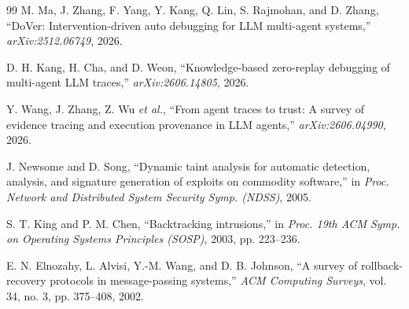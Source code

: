 \documentclass[10pt,twocolumn,a4paper]{article}
\begin{document}
\begin{thebibliography}{99}
M. Ma, J. Zhang, F. Yang, Y. Kang, Q. Lin, S. Rajmohan, and D. Zhang, ``DoVer:
Intervention-driven auto debugging for LLM multi-agent systems,''
\emph{arXiv:2512.06749}, 2026.

D. H. Kang, H. Cha, and D. Weon, ``Knowledge-based zero-replay debugging of
multi-agent LLM traces,'' \emph{arXiv:2606.14805}, 2026.

Y. Wang, J. Zhang, Z. Wu \emph{et al.}, ``From agent traces to trust: A survey
of evidence tracing and execution provenance in LLM agents,''
\emph{arXiv:2606.04990}, 2026.

J. Newsome and D. Song, ``Dynamic taint analysis for automatic detection,
analysis, and signature generation of exploits on commodity software,'' in
\emph{Proc. Network and Distributed System Security Symp. (NDSS)}, 2005.

S. T. King and P. M. Chen, ``Backtracking intrusions,'' in \emph{Proc. 19th ACM
Symp. on Operating Systems Principles (SOSP)}, 2003, pp. 223--236.

E. N. Elnozahy, L. Alvisi, Y.-M. Wang, and D. B. Johnson, ``A survey of
rollback-recovery protocols in message-passing systems,'' \emph{ACM Computing
Surveys}, vol. 34, no. 3, pp. 375--408, 2002.

\end{thebibliography}
\end{document}
